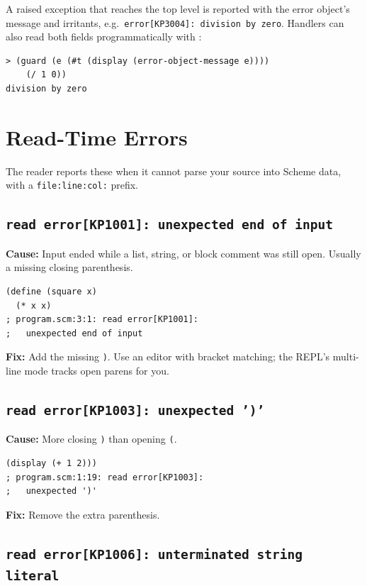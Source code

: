 A raised exception that reaches the top level is reported with the error object's message and irritants, e.g.\ \texttt{error[KP3004]: division by zero}. Handlers can also read both fields programmatically with :

\begin{lstlisting}[style=repl]
> (guard (e (#t (display (error-object-message e))))
    (/ 1 0))
division by zero
\end{lstlisting}

\section{Read-Time Errors}

The reader reports these when it cannot parse your source into Scheme data, with a \texttt{file:line:col:} prefix.

\subsection{\texttt{read error[KP1001]: unexpected end of input}}

\textbf{Cause:} Input ended while a list, string, or block comment was still open. Usually a missing closing parenthesis.

\begin{lstlisting}[style=repl]
(define (square x)
  (* x x)
; program.scm:3:1: read error[KP1001]:
;   unexpected end of input
\end{lstlisting}

\textbf{Fix:} Add the missing \texttt{)}. Use an editor with bracket matching; the REPL's multi-line mode tracks open parens for you.

\subsection{\texttt{read error[KP1003]: unexpected ')'}}

\textbf{Cause:} More closing \texttt{)} than opening \texttt{(}.

\begin{lstlisting}[style=repl]
(display (+ 1 2)))
; program.scm:1:19: read error[KP1003]:
;   unexpected ')'
\end{lstlisting}

\textbf{Fix:} Remove the extra parenthesis.

\subsection{\texttt{read error[KP1006]: unterminated string literal}}

